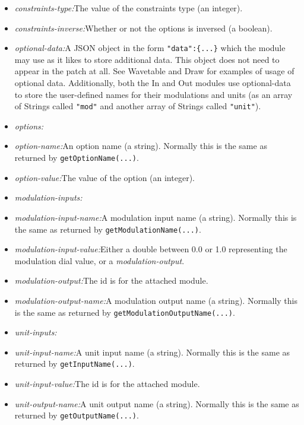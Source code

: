 \documentclass{article}
\begin{document}
\begin{itemize}
\item {\it constraints-type:}\quad The value of the constraints type (an integer).
\item {\it constraints-inverse:}\quad Whether or not the options is inversed (a boolean).
\item {\it optional-data:}\quad A JSON object in the form {\tt "data":\{...\}} which the module may use as it likes to store additional data.  This object does not need to appear in the patch at all.  See Wavetable and Draw for examples of usage of optional data.  Additionally, both the In and Out modules use optional-data to store the user-defined names for their modulations and units (as an array of Strings called {\tt "mod"} and another array of Strings called {\tt "unit"}).
\item {\it options:}
\item {\it option-name:}\quad An option name (a string).  Normally this is the same as returned by {\tt getOptionName(...)}.
\item {\it option-value:}\quad The value of the option (an integer). 
\item {\it modulation-inputs:}
\item {\it modulation-input-name:}\quad A modulation input name (a string).  Normally this is the same as returned by {\tt getModulationName(...)}.
\item {\it modulation-input-value:}\quad Either a double between 0.0 or 1.0 representing the modulation dial value, or a {\it modulation-output}. 
\item {\it modulation-output:}\qquad The id is for the attached module.
\item {\it modulation-output-name:}\quad A modulation output name (a string).  Normally this is the same as returned by {\tt getModulationOutputName(...)}.
\item {\it unit-inputs:}
\item {\it unit-input-name:}\quad A unit input name (a string).  Normally this is the same as returned by {\tt getInputName(...)}.
\item {\it unit-input-value:}\qquad The id is for the attached module.
\item {\it unit-output-name:}\quad A unit output name (a string).  Normally this is the same as returned by {\tt getOutputName(...)}.

\end{itemize}
\end{document}
